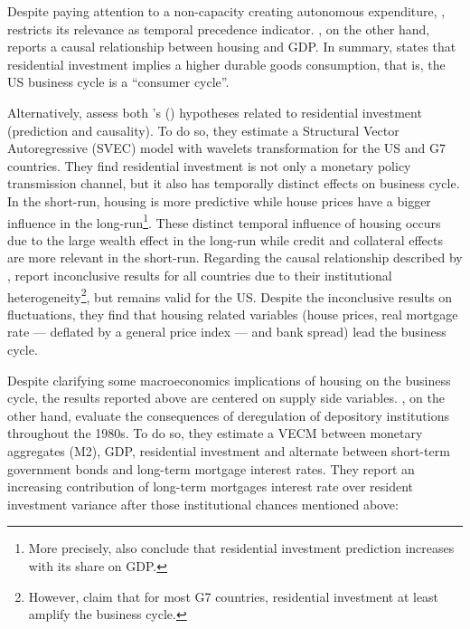\documentclass[11pt]{article}
\begin{document}
Despite paying attention to a non-capacity creating autonomous expenditure, \textcite{green_follow_1997}, restricts its relevance as temporal precedence indicator.
\textcite{leamer_housing_2007}, on the other hand, reports a causal relationship between housing and GDP.
In summary, states that residential investment implies a higher durable goods consumption, that is, the US business cycle is a ``consumer cycle''.

Alternatively, \textcite{huang_is_2018} assess both \citeauthor{leamer_housing_2007}'s (\citeyear{leamer_housing_2007}) hypotheses related to residential investment (prediction and causality). 
To do so, they estimate a Structural Vector Autoregressive (SVEC) model with wavelets transformation for the US and G7 countries.
They find residential investment is not only a monetary policy transmission channel, but it also has temporally distinct effects on business cycle.
In the short-run, housing is more predictive while house prices have a bigger influence in the long-run\footnote{More precisely, \textcite{huang_is_2018} also conclude that residential investment prediction increases with its share on GDP.}. 
These distinct temporal influence of housing occurs due to the large wealth effect in the long-run while credit and collateral effects are more relevant in the short-run.
Regarding the causal relationship described by \textcite{leamer_housing_2007}, 
\textcite{huang_is_2018} report inconclusive results for all countries due to their institutional heterogeneity\footnote{However, \textcite{huang_is_2018} claim that for most G7 countries, residential investment at least amplify the business cycle.}, but remains valid for the US.
Despite the inconclusive results on fluctuations, they find that housing related variables (house prices, real mortgage rate --- deflated by a general price index --- and bank spread) lead the business cycle.

Despite clarifying some macroeconomics  implications of housing on the business cycle, the results reported above are centered on supply side variables.
\textcite{gauger_residential_2003}, on the other hand, evaluate the consequences of deregulation of depository institutions throughout the 1980s.
To do so, they estimate a VECM between monetary aggregates (M2), GDP, residential investment and alternate between short-term government bonds and long-term mortgage interest rates. 
They report an increasing contribution of long-term mortgages interest rate over resident investment variance after those institutional chances mentioned above:
\end{document}
